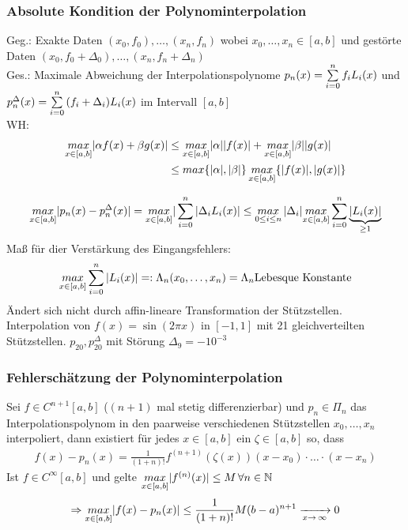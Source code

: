 \subsubsection{Absolute Kondition der Polynominterpolation}
Geg.: Exakte Daten $(x_0, f_0), \ldots, (x_n, f_n)$ wobei $x_0, \ldots, x_n \in [a, b]$ und
gestörte Daten $(x_0, f_0 + \Delta_0), \ldots, (x_n, f_n + \Delta_n)$ \\
Ges.: Maximale Abweichung der Interpolationspolynome $p_n(x) = \sum\limits_{i=0}^{n}{f_i L_i(x)}$ und
$p^{\Delta}_n(x) = \sum\limits_{i=0}^{n}{(f_i + \Delta_i) L_i(x)}$ im Intervall $[a, b]$ \\
WH:
\begin{align*}
  \underset{x \in [a, b]}{max} |\alpha f(x) + \beta g(x)| &\leq
    \underset{x \in [a, b]}{max} |\alpha| |f(x)| + \underset{x \in [a, b]}{max} |\beta| |g(x)| \\
  &\leq max\{|\alpha|, |\beta|\}\, \underset{x \in [a, b]}{max}\{|f(x)|, |g(x)|\}
\end{align*}

\begin{align*}
  \underset{x \in [a, b]}{max} |p_n(x) - p^{\Delta}_n(x)| = \underset{x \in [a, b]}{max} | \sum\limits_{i=0}^{n}{|\Delta_i L_i(x)} | \leq
  \underset{0 \leq i \leq n}{max}\,|\Delta_i| \underset{x \in [a, b]}{max} \sum\limits_{i=0}^{n}{\underbrace{|L_i(x)|}_{\geq 1}}
\end{align*}
Maß für dier Verstärkung des Eingangsfehlers:
\begin{equation*}
  \underset{x \in [a, b]}{max} \sum\limits_{i=0}^{n}{|L_i(x)|} =: \Lambda_n(x_0, \dots, x_n) = \Lambda_n 
  \text{Lebesque Konstante}
\end{equation*}
Ändert sich nicht durch affin-lineare Transformation der Stützstellen.
 Interpolation von $f(x) =\sin(2\pi x)$ in $[-1, 1]$ mit 21
gleichverteilten Stützstellen. $p_{20}, p_{20}^\Delta$ mit Störung $\Delta_9 = -10^{-3}$

\subsubsection{Fehlerschätzung der Polynominterpolation}
Sei $f \in C^{n+1} [a, b]$ ($(n+1)$ mal stetig differenzierbar) und $p_n \in \Pi_n$
das Interpolationspolynom in den paarweise verschiedenen Stützstellen $x_0, \dots, x_n$
interpoliert, dann existiert für jedes $x \in [a, b]$ ein $\zeta \in [a, b]$ so, dass
\begin{align*}
  f(x) - p_n(x) = \frac{1}{(1 + n)!} f^{(n+1)}(\zeta(x))(x - x_0)\cdot \dots \cdot(x - x_n)
\end{align*}
Ist $f \in C^\infty [a, b]$ und gelte $\underset{x \in [a, b]}{max} |f^{(n)}(x)| \leq M \, \forall n \in \mathbb{N}$ \\
\begin{align*}
  \Rightarrow \underset{x \in [a, b]}{max} |f(x) - p_n(x)| \leq 
  \frac{1}{(1 + n)!}M(b - a)^{n + 1} \xrightarrow[x\to\,\infty]{} 0
\end{align*}

